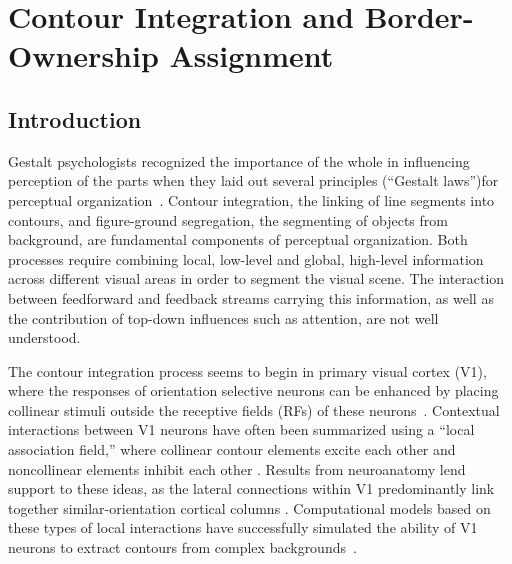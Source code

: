 \chapter{Contour Integration and Border-Ownership Assignment}
\label{sec:contour}

\section{Introduction}
\label{intro}

Gestalt psychologists recognized the importance of the whole in influencing perception of the parts when they laid out several principles (``Gestalt laws'')for perceptual organization~\citep{Wertheimer23,Koffka35}. Contour integration, the linking of line segments into contours, and figure-ground segregation, the segmenting of objects from background, are fundamental components of perceptual organization. Both processes require combining local, low-level and global, high-level information across different visual areas in order to segment the visual scene. The interaction between feedforward and feedback streams carrying this information, as well as the contribution of top-down influences such as attention, are not well understood.

The contour integration process seems to begin in primary visual cortex (V1), where the responses of orientation selective neurons can be enhanced by placing collinear stimuli outside the receptive fields (RFs) of these neurons~\citep{Stemmler_etal95a,Polat_etal98}. Contextual interactions between V1 neurons have often been summarized using a ``local association field,'' where collinear contour elements excite each other and noncollinear elements inhibit each other \citep{Ullman92, Field_etal93}. Results from neuroanatomy lend support to these ideas, as the lateral connections within V1 predominantly link together similar-orientation cortical columns \citep{Gilbert_Wiesel89,Bosking_etal97,
  Stettler_etal02}. Computational models based on these types of
local interactions have successfully simulated the ability of V1
neurons to extract contours from complex backgrounds~\citep{Li98,Yen_Finkel98,Piech_etal13}. 

